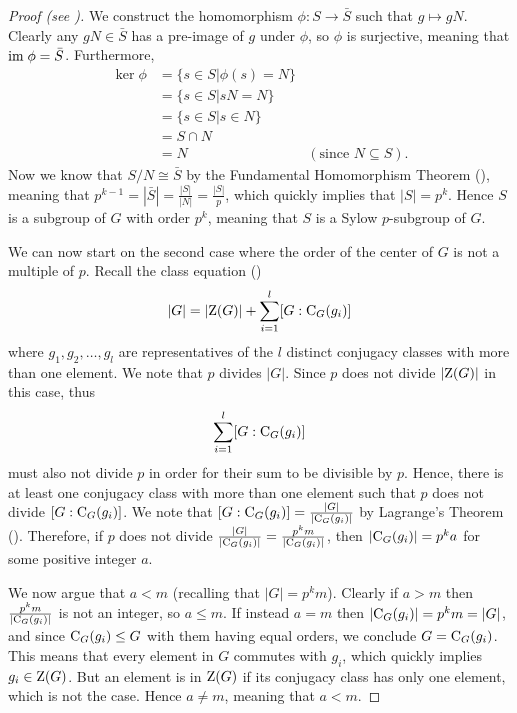 \begin{proof}[Proof (see {\cite[pp.~1--3]{mann_2011}})]
    We construct the homomorphism $\phi: S \to \bar{S}$ such that $g \mapsto gN$. Clearly any $gN \in \bar{S}$ has a pre-image of $g$ under $\phi$, so $\phi$ is surjective, meaning that $\mathrm{im}\; \phi = \bar{S}$. Furthermore,
    \begin{align*}
        \ker\phi &= \{s \in S \vert \phi(s) = N\}\\
        &= \{s \in S \vert sN = N \}\\
        &= \{s \in S \vert s \in N \}\\
        &= S \cap N\\
        &= N & (\text{since } N \subseteq S).
    \end{align*}
    Now we know that $S/N \cong \bar{S}$ by the Fundamental Homomorphism Theorem (), meaning that $p^{k-1} = |\bar{S}| = \frac{|S|}{|N|} = \frac{|S|}{p}$, which quickly implies that $|S| = p^k$. Hence $S$ is a subgroup of $G$ with order $p^k$, meaning that $S$ is a Sylow $p$-subgroup of $G$.

    We can now start on the second case where the order of the center of $G$ is not a multiple of $p$. Recall the class equation ()
    \[
        |G| = |\mathrm{Z}(G)| + \sum_{i=1}^l [G:\mathrm{C}_{G}(g_i)]
    \]
    where $g_1, g_2, \dots, g_l$ are representatives of the $l$ distinct conjugacy classes with more than one element. We note that $p$ divides $|G|$. Since $p$ does not divide $|\mathrm{Z}(G)|$ in this case, thus
    \[
        \sum_{i=1}^l [G:\mathrm{C}_{G}(g_i)]
    \]
    must also not divide $p$ in order for their sum to be divisible by $p$. Hence, there is at least one conjugacy class with more than one element such that $p$ does not divide $[G:\mathrm{C}_{G}(g_i)]$. We note that $[G:\mathrm{C}_{G}(g_i)] = \frac{|G|}{|\mathrm{C}_{G}(g_i)|}$ by Lagrange's Theorem (). Therefore, if $p$ does not divide $\frac{|G|}{|\mathrm{C}_{G}(g_i)|} = \frac{p^k m}{|\mathrm{C}_{G}(g_i)|}$, then $|\mathrm{C}_{G}(g_i)| = p^ka$ for some positive integer $a$.

    We now argue that $a < m$ (recalling that $|G| = p^km$). Clearly if $a > m$ then $\frac{p^k m}{|\mathrm{C}_{G}(g_i)|}$ is not an integer, so $a \leq m$. If instead $a = m$ then $|\mathrm{C}_{G}(g_i)| = p^km = |G|$, and since $\mathrm{C}_{G}(g_i) \leq G$ with them having equal orders, we conclude $G = \mathrm{C}_{G}(g_i)$. This means that every element in $G$ commutes with $g_i$, which quickly implies $g_i \in \mathrm{Z}(G)$. But an element is in $\mathrm{Z}(G)$ if its conjugacy class has only one element, which is not the case. Hence $a \neq m$, meaning that $a < m$.


\end{proof}
